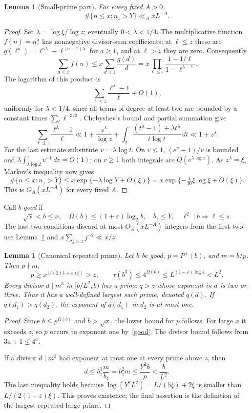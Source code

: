 \documentclass[11pt,a4paper]{article}
\newtheorem{lemma}[theorem]{Lemma}
\newcommand{\Om}{\Omega}
\newcommand{\dd}{\,d}
\begin{document}
\begin{lemma}[Small-prime part]\label{smallpart}
For every fixed $A>0$,
\[
 \#\{n\le x:n_z>Y\}\ll_A xL^{-A}.
\]
\end{lemma}
\begin{proof}
Set $\lambda=\log\xi/\log z$; eventually $0<\lambda<1/4$.
The multiplicative function $f(n)=n_z^\lambda$ has nonnegative
divisor-sum coefficients: at $\ell\le z$ these are
$g(\ell^a)=\ell^{a\lambda}-\ell^{(a-1)\lambda}$ for $a\ge1$,
and at $\ell>z$ they are zero. Consequently
\[
 \sum_{n\le x} f(n)
 \le x\sum_{d\ge1}\frac{g(d)}d
 =x\prod_{\ell\le z}\frac{1-1/\ell}{1-\ell^{\lambda-1}}.
\]
The logarithm of this product is
\[
 \sum_{\ell\le z}\frac{\ell^\lambda-1}{\ell}+O(1),
\]
uniformly for $\lambda<1/4$, since all terms of degree at least two
are bounded by a constant times $\sum_\ell\ell^{-3/2}$.
Chebyshev's bound and partial summation give
\[
 \sum_{\ell\le z}\frac{\ell^\lambda-1}{\ell}
 \ll 1+\frac{z^\lambda}{\log z}
 +\int_2^z\frac{(t^\lambda-1)+\lambda t^\lambda}{t\log t}\dd t
 \ll 1+z^\lambda.
\]
For the last estimate substitute $v=\lambda\log t$.
On $v\le1$, $(e^v-1)/v$ is bounded and
$\lambda\int_{\lambda\log2}^1v^{-1}\dd v=O(1)$;
on $v\ge1$ both integrals are $O(e^{\lambda\log z})$.
As $z^\lambda=\xi$, Markov's inequality now gives
\[
 \#\{n\le x:n_z>Y\}
 \le x\exp\{-\lambda\log Y+O(\xi)\}
 =x\exp\{-\tfrac1{10}\xi\log\xi+O(\xi)\}.
\]
This is $O_A(xL^{-A})$ for every fixed $A$.
\end{proof}

Call $b$ \emph{good} if
\begin{equation}\label{good}
 \sqrt x<b\le x,\quad
 \Om(b)\le(1+\varepsilon)\log_2 b,\quad
 b_z\le Y,\quad \ell^2\mid b\Longrightarrow\ell\le z.
\end{equation}
The last two conditions discard at most $O_A(xL^{-A})$ integers from
the first two: use Lemma~\ref{smallpart} and
$x\sum_{j>z}j^{-2}\ll x/z$.

\begin{lemma}[Canonical repeated prime]\label{assignment}
Let $b$ be good, $p=P^+(b)$, and $m=b/p$. Then $p\nmid m$,
\[
 p\ge x^{1/(2(1+\varepsilon)\xi)}>z,\qquad
 \tau(b^3)\le4^{\Om(b)}\le L^{(1+\varepsilon)\log4}<L^2.
\]
Every divisor $d\mid m^3$ in $[b/L^2,b)$ has a prime $q>z$
whose exponent in $d$ is two or three. Thus it has a well-defined
largest such prime, denoted $q(d)$. If $q(d_1)>q(d_2)$, the exponent
of $q(d_1)$ in $d_2$ is at most one.
\end{lemma}
\begin{proof}
Since $b\le p^{\Om(b)}$ and $b>\sqrt x$, the lower bound for $p$
follows. For large $x$ it exceeds $z$, so $p$ occurs to exponent one
by~\eqref{good}. The divisor bound follows from $3a+1\le4^a$.

If a divisor $d\mid m^3$ had exponent at most one at every prime
above $z$, then
\[
 d\le b_z^3\frac{m}{b_z}=b_z^2m
 \le\frac{Y^2b}{p}<\frac b{L^2}.
\]
The last inequality holds because
$\log(Y^2L^2)=L/(5\xi)+2\xi$
is smaller than $L/(2(1+\varepsilon)\xi)$.
This proves existence; the final assertion is the definition of the
largest repeated large prime.
\end{proof}
\end{document}
